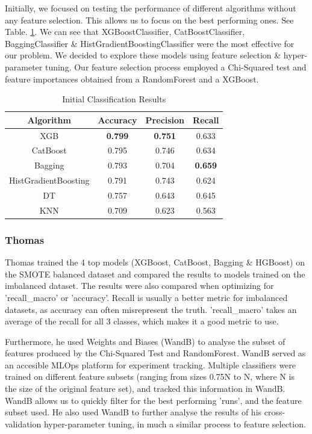 \documentclass[conference]{IEEEtran}
\begin{document}
Initially, we focused on testing the performance of different algorithms without any feature selection. This allows us to focus on the best performing ones. See Table. \ref{tab:initial-clf-results}. We can see that XGBoostClassifier, CatBoostClassifier, BaggingClassifier \& HistGradientBoostingClassifier were the most effective for our problem. We decided to explore these models using feature selection \& hyper-parameter tuning. Our feature selection process employed a Chi-Squared test and feature importances obtained from a RandomForest and a XGBoost.

\begin{table}[h]
  \centering
  \caption{Initial Classification Results}
  \label{tab:initial-clf-results}
  \begin{tabular}{|c|c|c|c|}
    \hline
    \textbf{Algorithm} & \textbf{Accuracy} & \textbf{Precision} & \textbf{Recall} \\ \hline
    XGB	& \textbf{0.799} & \textbf{0.751} & 0.633 \\
    \hline
    CatBoost & 0.795 & 0.746 & 0.634 \\
    \hline
    Bagging & 0.793 & 0.704 & \textbf{0.659} \\
    \hline
    HistGradientBoosting & 0.791 & 0.743 & 0.624 \\
    \hline
    DT & 0.757 & 0.643 & 0.645 \\
    \hline
    KNN & 0.709 & 0.623 & 0.563 \\
    \hline
  \end{tabular}
\end{table}


\subsubsection{Thomas}

Thomas trained the 4 top models (XGBoost, CatBoost, Bagging \& HGBoost) on the SMOTE balanced dataset and compared the results to models trained on the imbalanced dataset. The results were also compared when optimizing for 'recall\_macro' or 'accuracy'. Recall is usually a better metric for imbalanced datasets, as accuracy can often misrepresent the truth. 'recall\_macro' takes an average of the recall for all 3 classes, which makes it a good metric to use.

Furthermore, he used Weights and Biases (WandB) \cite{wandb} to analyse the subset of features produced by the Chi-Squared Test and RandomForest. WandB served as an accesible MLOps platform for experiment tracking. Multiple classifiers were trained on different feature subsets (ranging from sizes 0.75N to N, where N is the size of the original feature set), and tracked this information in WandB. WandB allows us to quickly filter for the best performing 'runs', and the feature subset used. He also used WandB to further analyse the results of his cross-validation hyper-parameter tuning, in much a similar process to feature selection.
\end{document}
